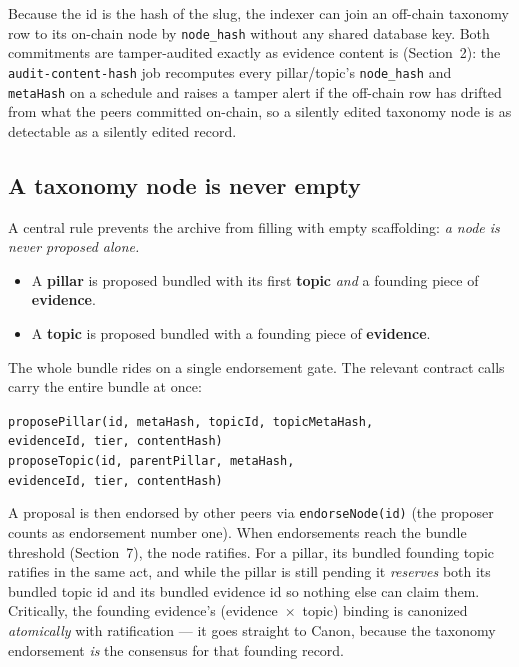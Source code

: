 \documentclass[11pt,a4paper]{article}
\begin{document}
Because the id is the hash of the slug, the indexer can join an off-chain
taxonomy row to its on-chain node by \texttt{node\_hash} without any shared
database key. Both commitments are tamper-audited exactly as evidence content
is (Section~2): the \texttt{audit-content-hash} job recomputes every
pillar/topic's \texttt{node\_hash} and \texttt{metaHash} on a schedule and
raises a tamper alert if the off-chain row has drifted from what the peers
committed on-chain, so a silently edited taxonomy node is as detectable as a
silently edited record.

\subsection{A taxonomy node is never empty}

A central rule prevents the archive from filling with empty scaffolding:
\emph{a node is never proposed alone.}

\begin{itemize}[leftmargin=1.4em]
  \item A \textbf{pillar} is proposed bundled with its first \textbf{topic}
  \emph{and} a founding piece of \textbf{evidence}.
  \item A \textbf{topic} is proposed bundled with a founding piece of
  \textbf{evidence}.
\end{itemize}

The whole bundle rides on a single endorsement gate. The relevant contract
calls carry the entire bundle at once:

\begin{plainbox}
\texttt{proposePillar(id, metaHash, topicId, topicMetaHash,}\\
\hspace*{2em}\texttt{evidenceId, tier, contentHash)}\\[0.3em]
\texttt{proposeTopic(id, parentPillar, metaHash,}\\
\hspace*{2em}\texttt{evidenceId, tier, contentHash)}
\end{plainbox}

A proposal is then endorsed by other peers via \texttt{endorseNode(id)} (the
proposer counts as endorsement number one). When endorsements reach the
bundle threshold (Section~7), the node ratifies. For a pillar, its bundled
founding topic ratifies in the same act, and while the pillar is still
pending it \emph{reserves} both its bundled topic id and its bundled
evidence id so nothing else can claim them. Critically, the founding
evidence's (evidence~$\times$~topic) binding is canonized \emph{atomically}
with ratification --- it goes straight to Canon, because the taxonomy
endorsement \emph{is} the consensus for that founding record.
\end{document}
